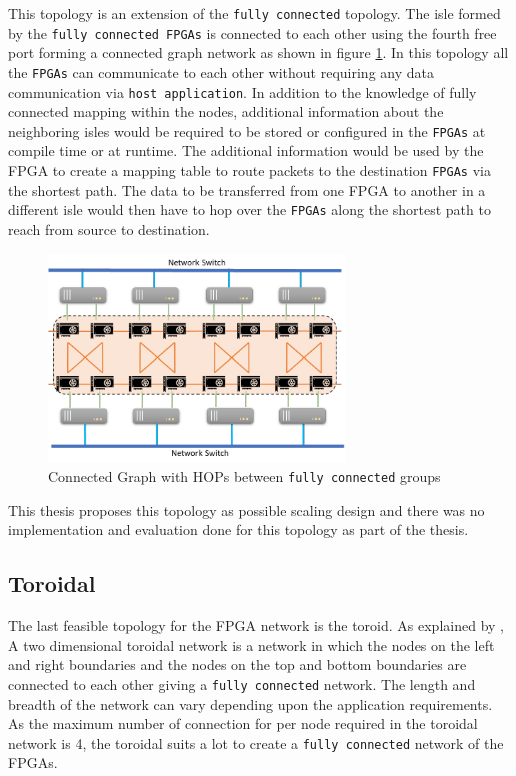 This topology is an extension of the \texttt{fully connected} topology.
The isle formed by the \texttt{fully connected FPGAs} is connected
to each other using the fourth free port forming a connected graph network
as shown in figure \ref{fig:connected_graph}.
In this topology all the \texttt{FPGAs} can communicate to each other without requiring
any data communication via \texttt{host application}. In addition to the knowledge of fully
connected mapping within the nodes, additional information about the neighboring
isles would be required to be stored or configured in the \texttt{FPGAs} at compile time
or at runtime. The additional information would be used by the FPGA to create
a mapping table to route packets to the destination \texttt{FPGAs} via the shortest path.
The data to be transferred from one FPGA to another in a different isle would
then have to hop over the \texttt{FPGAs} along the shortest path to reach
from source to destination.

\begin{figure}[h]%
    \centering
    \includegraphics[width=0.7\textwidth]{images/connected_graph}
    \caption{Connected Graph with HOPs between \texttt{fully connected} groups}
    \label{fig:connected_graph}
\end{figure}

This thesis proposes this topology as possible scaling design and there was no
implementation and evaluation done for this topology as part of the thesis.

\subsection{Toroidal}
\label{sec:toroidal}

The last feasible topology for the FPGA network is the toroid. As explained by
\textcite{robertazzi_toroidal_1988}, A two dimensional toroidal network is
a network in which the nodes on the left and right boundaries and the
nodes on the top and bottom boundaries are connected to each other giving
a \texttt{fully connected} network. The length and breadth of the network can vary
depending upon the application requirements. As the maximum number of
connection for per node required in the toroidal network is 4, the toroidal
suits a lot to create a \texttt{fully connected} network of the FPGAs.

